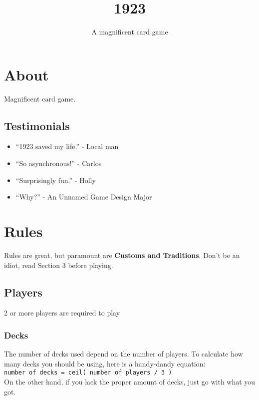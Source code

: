\documentclass[11pt]{article}
\title{1923}
\author{A magnificent card game}
\date{}
\begin{document}
\maketitle

\setcounter{tocdepth}{3}
\tableofcontents
\vspace*{1cm}


\section{About}
\label{sec-1}

Magnificent card game.
\subsection{Testimonials}
\label{sec-1-1}

\begin{itemize}
\item ``1923 saved my life.'' - Local man
\item ``So asynchronous!'' - Carlos
\item ``Surprisingly fun.'' - Holly
\item ``Why?'' - An Unnamed Game Design Major 
\end{itemize}
  
\section{Rules}
\label{sec-2}


Rules are great, but paramount are \textbf{Customs and Traditions}. Don't be
an idiot, read Section 3 before playing.
\subsection{Players}
\label{sec-2-1}

2 or more players are required to play
\subsubsection{Decks}
\label{sec-2-1-1}

The number of decks used depend on the number of players. To
calculate how many decks you should be using, here is a handy-dandy
equation:\\

\texttt{number of decks = ceil( number of players / 3 )}\\

On the other hand, if you lack the proper amount of decks, just go
with what you got. 
\end{document}
